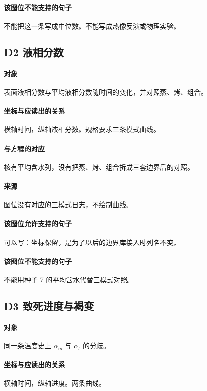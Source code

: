 \paragraph{该图位不能支持的句子}
不能把这一条写成中位数。不能写成热像反演或物理实验。

\subsection{D2 液相分数}
\paragraph{对象}
表面液相分数与平均液相分数随时间的变化，并对照蒸、烤、组合。

\paragraph{坐标与应读出的关系}
横轴时间，纵轴液相分数。规格要求三条模式曲线。

\paragraph{与方程的对应}
核有平均含水列，没有把蒸、烤、组合拆成三套边界后的对照。

\paragraph{来源}
图位没有对应的三模式日志，不绘制曲线。

\paragraph{该图位允许支持的句子}
可以写：坐标保留，是为了以后的边界库接入时列名不变。

\paragraph{该图位不能支持的句子}
不能用种子 7 的平均含水代替三模式对照。

\subsection{D3 致死进度与褐变}
\paragraph{对象}
同一条温度史上 $\alpha_m$ 与 $\alpha_b$ 的分歧。

\paragraph{坐标与应读出的关系}
横轴时间，纵轴进度。两条曲线。

